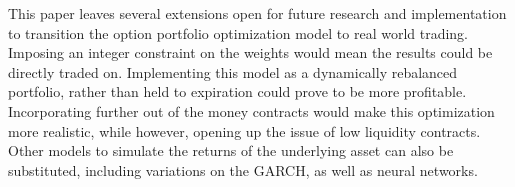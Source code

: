 This paper leaves several extensions open for future research and implementation to transition the option portfolio optimization model to real world trading. Imposing an integer constraint on the weights would mean the results could be directly traded on. Implementing this model as a dynamically rebalanced portfolio, rather than held to expiration could prove to be more profitable. Incorporating further out of the money contracts would make this optimization more realistic, while however, opening up the issue of low liquidity contracts. Other models to simulate the returns of the underlying asset can also be substituted, including variations on the GARCH, as well as neural networks. 

\clearpage

\nocite{*}


\clearpage

